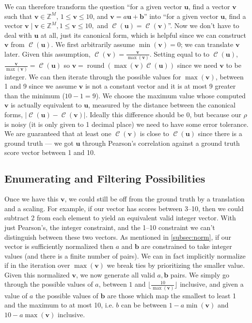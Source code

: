 \documentclass[11pt, oneside]{article}
\DeclareMathOperator{\C}{\mathcal{C}}
\DeclareMathOperator{\round}{round}
\renewcommand{\vec}[1]{\bm{#1}}
\theoremstyle{plain}
\theoremstyle{definition}
\begin{document}
We can therefore transform the question \enquote{for a given vector \( \vec{u}
\), find a vector \( \vec{v} \) such that \( \vec{v} \in \mathbb{Z}^M \),
\( 1 \leq \vec{v} \leq 10 \), and \( \vec{v} = a \vec{u} + \vec{b} \)} into
\enquote{for a given vector \( \vec{u} \), find a vector \( \vec{v} \mid
\vec{v} \in \mathbb{Z}^M, 1 \leq \vec{v} \leq 10, \) and \( \C(\vec{u}) =
\C(\vec{v}) \)}. Now we don't have to deal with \( \vec{u} \) at all, just
its canonical form, which is helpful since we can construct \( \vec{v} \)
from \( \C(\vec{u}) \). We first arbitrarily assume \( \min(\vec{v}) = 0 \);
we can translate \( \vec{v} \) later. Given this assumption, \( \C(\vec{v})
= \frac{\vec{v}}{\max(\vec{v})} \). Setting equal to to \( \C(\vec{u})
\), \( \frac{\vec{v}}{\max(\vec{v})} = \C(\vec{u}) \) so \( \vec{v} =
\round(\max(\vec{v}) \C(\vec{u})) \) since we need \( \vec{v} \) to be integer.
We can then iterate through the possible values for \( \max(\vec{v}) \),
between 1 and 9 since we assume \( \vec{v} \) is not a constant vector and
it is at most 9 greater than the minimum (\( 10 - 1 = 9 \)). We choose the
maximum value whose computed \( \vec{v} \) is actually equivalent to \( \vec{u}
\), measured by the distance between the canonical forms, \( |\C(\vec{u}) -
\C(\vec{v})| \). Ideally this difference should be 0, but because our \( \rho
\) is noisy (it is only given to 1 decimal place) we need to have some error
tolerance. We are guaranteed that at least one \( \C(\vec{v}) \) is close to \(
\C(\vec{u}) \) since there is a ground truth --- we got \( \vec{u} \) through
Pearson's correlation against a ground truth score vector between 1 and 10.

\subsection{Enumerating and Filtering Possibilities}

Once we have this \( \vec{v} \), we could still be off from the ground truth
by a translation and a scaling. For example, if our vector has scores between
3--10, then we could subtract 2 from each element to yield an equivalent valid
integer vector. With just Pearson's, the integer constraint, and the 1--10
constraint we can't distinguish between these two vectors. As mentioned in
\autoref{subsec:norm}, if our vector is sufficiently normalized then \( a \)
and \( \vec{b} \) are constrained to take integer values (and there is a finite
number of pairs). We can in fact implicitly normalize if in the iteration over
\( \max(\vec{v}) \) we break ties by prioritizing the smaller value. Given this
normalized \( \vec{v} \), we now generate all valid \( a, \vec{b} \) pairs.
We simply go through the possible values of \( a \), between \( 1 \) and \(
\lfloor \frac{10}{\max(\vec{v})} \rfloor \) inclusive, and given a value of
\( a \) the possible values of \( \vec{b} \) are those which map the smallest
to least 1 and the maximum to at most 10, i.e. \( b \) can be between \( 1 -
a \min(\vec{v}) \) and \( 10 - a \max(\vec{v}) \) inclusive.
\end{document}
